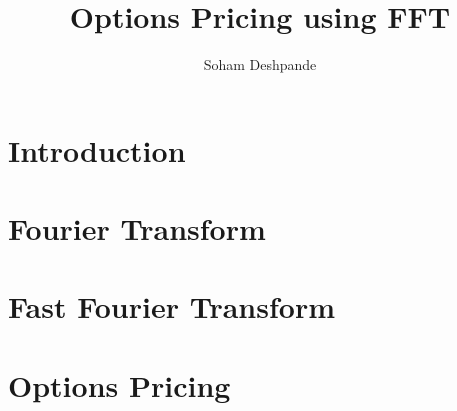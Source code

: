 \documentclass[12pt]{article}
\begin{document}
\title{Options Pricing using FFT }
\author{Soham Deshpande}
\maketitle
\clearpage
\tableofcontents
\clearpage

\section{Introduction}

\clearpage
\section{Fourier Transform}

\clearpage
\section{Fast Fourier Transform}

\clearpage
\section{Options Pricing}
\end{document}
